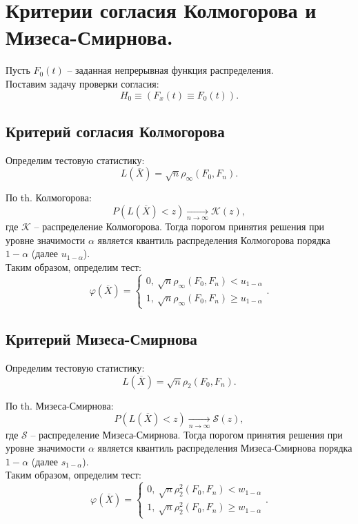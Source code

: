 \section{Критерии согласия Колмогорова и Мизеса-Смирнова.}

Пусть $F_0(t)$ -- заданная непрерывная функция распределения.\\

Поставим задачу проверки согласия:
\[
  H_0 \equiv (F_x(t) \equiv F_0(t))
.\]

\subsection{Критерий согласия Колмогорова}

Определим тестовую статистику:
\[
  L(\overline{X}) = \sqrt{n} \rho_{\infty}(F_0, F_n)
.\]

По th. Колмогорова:
\[
  P(L(\overline{X}) < z) \xrightarrow[n \to \infty]{} \mathcal{K}(z)
,\]
где $\mathcal{K}$ -- распределение Колмогорова.
Тогда порогом принятия решения при уровне значимости $\alpha$ является
квантиль распределения Колмогорова порядка $1 - \alpha$
(далее $u_{1 - \alpha}$).\\

Таким образом, определим тест:
\[
  \varphi(\overline{X}) = \begin{cases}
    0,~ \sqrt{n} \rho_{\infty}(F_0, F_n) < u_{1 - \alpha}\\
    1,~ \sqrt{n} \rho_{\infty}(F_0, F_n) \geqslant u_{1 - \alpha}
  \end{cases}
.\]

\subsection{Критерий Мизеса-Смирнова}

Определим тестовую статистику:
\[
  L(\overline{X}) = \sqrt{n} \rho_{2}(F_0, F_n)
.\]

По th. Мизеса-Смирнова:
\[
  P(L(\overline{X}) < z) \xrightarrow[n \to \infty]{} \mathcal{S}(z)
,\]
где $\mathcal{S}$ -- распределение Мизеса-Смирнова.
Тогда порогом принятия решения при уровне значимости $\alpha$ является
квантиль распределения Мизеса-Смирнова порядка $1 - \alpha$
(далее $s_{1 - \alpha}$).\\

Таким образом, определим тест:
\[
  \varphi(\overline{X}) = \begin{cases}
    0,~ \sqrt{n} \rho_{2}^{2}(F_0, F_n) < w_{1 - \alpha}\\
    1,~ \sqrt{n} \rho_{2}^{2}(F_0, F_n) \geqslant w_{1 - \alpha}
  \end{cases}
.\]

